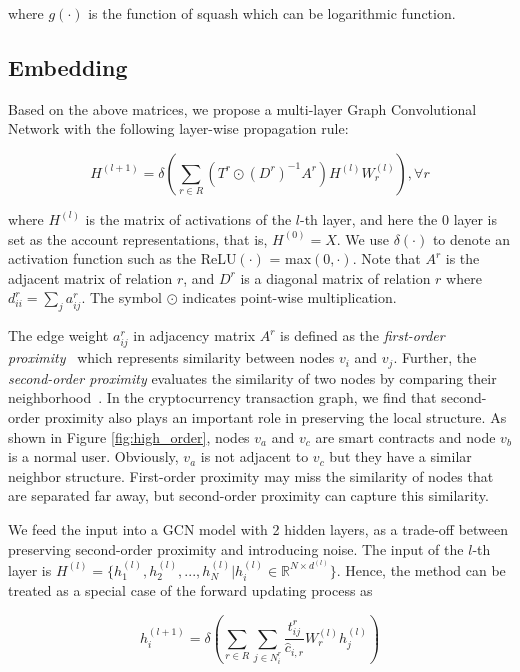 \noindent where $g(\cdot)$ is the function of squash which can be logarithmic function.

\subsection{Embedding}
\label{sec:rGCN layers}
Based on the above matrices, we propose a multi-layer Graph Convolutional Network with the following layer-wise propagation rule:

\begin{equation}
H^{(l+1)}=\delta(\sum_{r\in R} (T^r\odot (D^r)^{-1}A^r)H^{(l)}W_r^{(l)}),\forall r
\end{equation}

\noindent where $H^{(l)}$ is the matrix of activations of the $l$-th layer, and here the $0$ layer is set as the account representations, that is, $H^{(0)}=X$. We use $\delta(\cdot)$ to denote an activation function such as the ReLU$(\cdot)$ = max$(0,\cdot)$. Note that $A^r$ is the adjacent matrix of relation $r$, and $D^r$ is a diagonal matrix of relation $r$ where $d^r_{ii}=\sum_{j}a^r_{ij}$. The symbol $\odot$ indicates point-wise multiplication.

The edge weight $a^r_{ij}$ in adjacency matrix $A^r$ is defined as the \emph{first-order proximity}~\cite{tang2015line} which represents similarity between nodes $v_i$ and $v_j$. Further, the \emph{second-order proximity} evaluates the similarity of two nodes by comparing their neighborhood~\cite{goyal2018graph}. In the cryptocurrency transaction graph, we find that second-order proximity also plays an important role in preserving the local structure. As shown in Figure \ref{fig:high_order}, nodes $v_a$ and $v_c$ are smart contracts and node $v_b$ is a normal user. Obviously, $v_a$ is not adjacent to $v_c$  but they have a similar neighbor structure. First-order proximity may miss the similarity of nodes that are separated far away, but second-order proximity can capture this similarity.

We feed the input into a GCN model with 2 hidden layers, as a trade-off between preserving second-order proximity and introducing noise. The input of the $l$-th layer is $H^{(l)}=\{h_1^{(l)},h_2^{(l)},...,h_N^{(l)}|h_i^{(l)}\in \mathbb{R}^{N \times d^{(l)}}\}$. Hence, the method can be treated as a special case of the forward updating process as

\begin{equation}
h_i^{(l+1)}=\delta(\sum_{r\in R} \sum_{j \in N_i^r} \frac{t_{ij}^r}{\hat c_{i,r}}W_r^{(l)}h_j^{(l)})
\end{equation}

